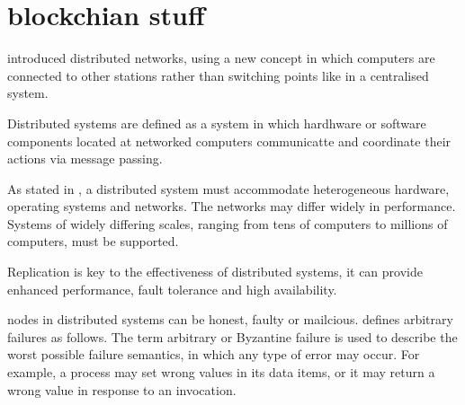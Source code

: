 \section{blockchian stuff} %

\cite{baran_distributed_1964} introduced distributed networks, using a new concept in which computers are connected to other stations rather than switching points like in a centralised system.

Distributed systems are defined as a system in which hardhware or software components located at networked computers communicatte and coordinate their actions via message passing. \cite{coulouris_distributed_2011}

As stated in \cite{coulouris_distributed_2011}, a distributed system must accommodate heterogeneous hardware, operating systems and networks. The networks may differ widely in performance. Systems of widely differing scales, ranging from tens of computers to millions of computers, must be supported.

Replication is key to the effectiveness of distributed systems, it can provide enhanced performance, fault tolerance and high availability. \cite{coulouris_distributed_2011}

nodes in distributed systems can be honest, faulty or mailcious. \cite{bashir_mastering_2017}
\cite{coulouris_distributed_2011} defines arbitrary failures as follows. The term arbitrary or Byzantine failure is used to describe the worst possible failure semantics, in which any type of error may occur. 
For example, a process may set wrong values in its data items, or it may return a wrong value in response to an invocation.

